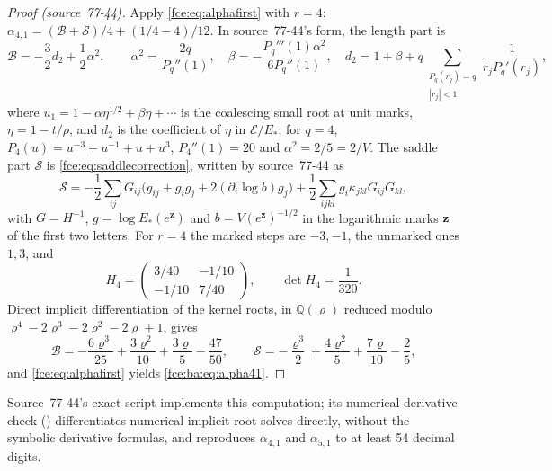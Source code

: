 \documentclass[11pt,a4paper]{article}
\numberwithin{equation}{section}
\theoremstyle{definition}\newtheorem{definition}[theorem]{Definition}
\theoremstyle{remark}\newtheorem{remark}[theorem]{Remark}
\newcommand{\Q}{\mathbb Q}
\newcommand{\E}{\mathcal E}
\begin{document}
\begin{proof}[Proof (source~77-44)]
Apply \eqref{fce:eq:alphafirst} with $r=4$: $\alpha_{4,1}=(\mathcal B+\mathcal
S)/4+(1/4-4)/12$. In source~77-44's form, the length part is
\[
 \mathcal B=-\frac32d_2+\frac12\alpha^2,\qquad
 \alpha^2=\frac{2q}{P_q''(1)},\quad
 \beta=-\frac{P_q'''(1)\alpha^2}{6P_q''(1)},\quad
 d_2=1+\beta+q\sum_{\substack{P_q(r_j)=q\\|r_j|<1}}\frac1{r_jP_q'(r_j)},
\]
where $u_1=1-\alpha\eta^{1/2}+\beta\eta+\cdots$ is the coalescing small
root at unit marks, $\eta=1-t/\rho$, and $d_2$ is the coefficient of $\eta$
in $\E/E_*$; for $q=4$, $P_4(u)=u^{-3}+u^{-1}+u+u^3$, $P_4''(1)=20$ and
$\alpha^2=2/5=2/V$. The saddle part $\mathcal S$ is
\eqref{fce:eq:saddlecorrection}, written by source~77-44 as
\[
 \mathcal S=-\frac12\sum_{ij}G_{ij}\bigl(g_{ij}+g_ig_j+2(\partial_i\log b)g_j\bigr)
 +\frac12\sum_{ijkl}g_i\kappa_{jkl}G_{ij}G_{kl},
\]
with $G=H^{-1}$, $g=\log E_*(e^{\boldsymbol z})$ and $b=V(e^{\boldsymbol z})^{-1/2}$
in the logarithmic marks $\boldsymbol z$ of the first two letters. For $r=4$
the marked steps are $-3,-1$, the unmarked ones $1,3$, and
\begin{equation}\label{fce:ba:eq:H4}
 H_4=\begin{pmatrix}3/40&-1/10\\-1/10&7/40\end{pmatrix},\qquad
 \det H_4=\frac1{320}.
\end{equation}
Direct implicit differentiation of the kernel roots, in $\Q(\varrho)$ reduced
modulo $\varrho^4-2\varrho^3-2\varrho^2-2\varrho+1$, gives
\begin{equation}\label{fce:ba:eq:BS}
 \mathcal B=-\frac{6\varrho^3}{25}+\frac{3\varrho^2}{10}+\frac{3\varrho}5-\frac{47}{50},
 \qquad
 \mathcal S=-\frac{\varrho^3}2+\frac{4\varrho^2}5+\frac{7\varrho}{10}-\frac25,
\end{equation}
and \eqref{fce:eq:alphafirst} yields \eqref{fce:ba:eq:alpha41}.
\end{proof}
Source~77-44's exact script 
implements this computation; its numerical-derivative check
() differentiates
numerical implicit root solves directly, without the symbolic derivative
formulas, and reproduces $\alpha_{4,1}$ and $\alpha_{5,1}$ to at least 54
decimal digits.
\end{document}
